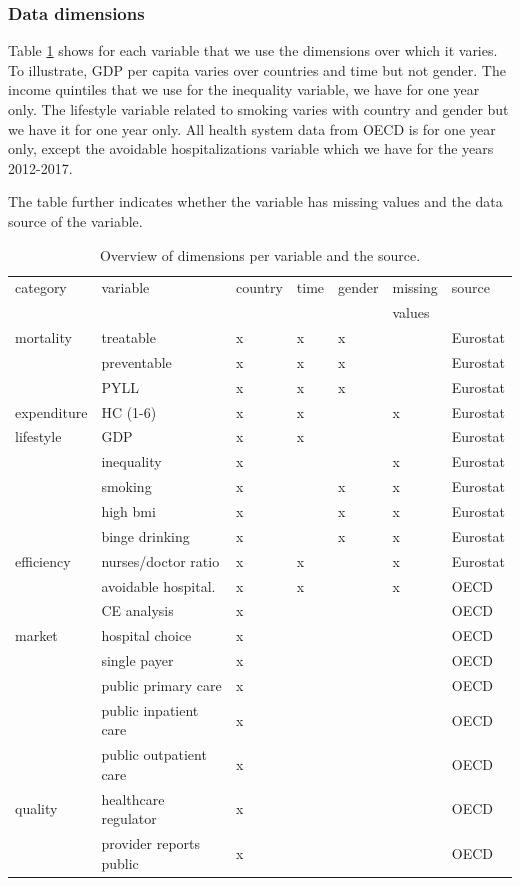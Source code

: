 \documentclass[a4paper,12pt]{article}
\begin{document}
\subsubsection{Data dimensions}
\label{sec:orgeaa3776}
\label{sec:data_dimensions}

Table \ref{tab:data_dimensions} shows for each variable that we use the dimensions over which it varies. To illustrate, GDP per capita varies over countries and time but not gender. The income quintiles that we use for the inequality variable, we have for one year only. The lifestyle variable related to smoking varies with country and gender but we have it for one year only. All health system data from OECD is for one year only, except the avoidable hospitalizations variable which we have for the years 2012-2017.

The table further indicates whether the variable has missing values and the data source of the variable.

\begin{table}[htbp]
\caption{\label{tab:data_dimensions}Overview of dimensions per variable and the source.}
\centering
\begin{tabular}{lllllll}
category & variable & country & time & gender & missing & source\\
 &  &  &  &  & values & \\
\hline
mortality & treatable & x & x & x &  & Eurostat\\
 & preventable & x & x & x &  & Eurostat\\
 & PYLL & x & x & x &  & Eurostat\\
expenditure & HC (1-6) & x & x &  & x & Eurostat\\
lifestyle & GDP & x & x &  &  & Eurostat\\
 & inequality & x &  &  & x & Eurostat\\
 & smoking & x &  & x & x & Eurostat\\
 & high bmi & x &  & x & x & Eurostat\\
 & binge drinking & x &  & x & x & Eurostat\\
efficiency & nurses/doctor ratio & x & x &  & x & Eurostat\\
 & avoidable hospital. & x & x &  & x & OECD\\
 & CE analysis & x &  &  &  & OECD\\
market & hospital choice & x &  &  &  & OECD\\
 & single payer & x &  &  &  & OECD\\
 & public primary care & x &  &  &  & OECD\\
 & public inpatient care & x &  &  &  & OECD\\
 & public outpatient care & x &  &  &  & OECD\\
quality & healthcare regulator & x &  &  &  & OECD\\
 & provider reports public & x &  &  &  & OECD\\
\end{tabular}
\end{table}
\end{document}
